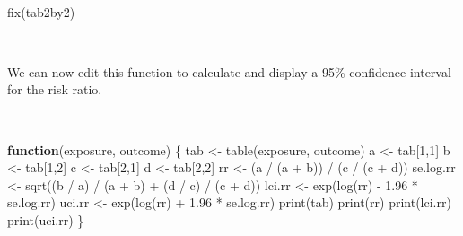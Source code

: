\documentclass[
  12pt,
]{book}
\newenvironment{Shaded}{\begin{snugshade}}{\end{snugshade}}
\newcommand{\ControlFlowTok}[1]{\textcolor[rgb]{0.13,0.29,0.53}{\textbf{#1}}}
\newcommand{\DecValTok}[1]{\textcolor[rgb]{0.00,0.00,0.81}{#1}}
\newcommand{\FloatTok}[1]{\textcolor[rgb]{0.00,0.00,0.81}{#1}}
\newcommand{\FunctionTok}[1]{\textcolor[rgb]{0.00,0.00,0.00}{#1}}
\newcommand{\NormalTok}[1]{#1}
\newcommand{\OtherTok}[1]{\textcolor[rgb]{0.56,0.35,0.01}{#1}}
\newcommand{\SpecialCharTok}[1]{\textcolor[rgb]{0.00,0.00,0.00}{#1}}
\begin{document}
~

\begin{Shaded}
\begin{Highlighting}[]
\FunctionTok{fix}\NormalTok{(tab2by2)}
\end{Highlighting}
\end{Shaded}

~

We can now edit this function to calculate and display a 95\% confidence interval for the risk ratio.

~

\begin{Shaded}
\begin{Highlighting}[]
\ControlFlowTok{function}\NormalTok{(exposure, outcome) \{}
\NormalTok{  tab }\OtherTok{\textless{}{-}} \FunctionTok{table}\NormalTok{(exposure, outcome)}
\NormalTok{  a }\OtherTok{\textless{}{-}}\NormalTok{ tab[}\DecValTok{1}\NormalTok{,}\DecValTok{1}\NormalTok{]}
\NormalTok{  b }\OtherTok{\textless{}{-}}\NormalTok{ tab[}\DecValTok{1}\NormalTok{,}\DecValTok{2}\NormalTok{]}
\NormalTok{  c }\OtherTok{\textless{}{-}}\NormalTok{ tab[}\DecValTok{2}\NormalTok{,}\DecValTok{1}\NormalTok{]}
\NormalTok{  d }\OtherTok{\textless{}{-}}\NormalTok{ tab[}\DecValTok{2}\NormalTok{,}\DecValTok{2}\NormalTok{]}
\NormalTok{  rr }\OtherTok{\textless{}{-}}\NormalTok{ (a }\SpecialCharTok{/}\NormalTok{ (a }\SpecialCharTok{+}\NormalTok{ b)) }\SpecialCharTok{/}\NormalTok{ (c }\SpecialCharTok{/}\NormalTok{ (c }\SpecialCharTok{+}\NormalTok{ d))}
\NormalTok{  se.log.rr }\OtherTok{\textless{}{-}} \FunctionTok{sqrt}\NormalTok{((b }\SpecialCharTok{/}\NormalTok{ a) }\SpecialCharTok{/}\NormalTok{ (a }\SpecialCharTok{+}\NormalTok{ b) }\SpecialCharTok{+}\NormalTok{ (d }\SpecialCharTok{/}\NormalTok{ c) }\SpecialCharTok{/}\NormalTok{ (c }\SpecialCharTok{+}\NormalTok{ d)) }
\NormalTok{  lci.rr }\OtherTok{\textless{}{-}} \FunctionTok{exp}\NormalTok{(}\FunctionTok{log}\NormalTok{(rr) }\SpecialCharTok{{-}} \FloatTok{1.96} \SpecialCharTok{*}\NormalTok{ se.log.rr)}
\NormalTok{  uci.rr }\OtherTok{\textless{}{-}} \FunctionTok{exp}\NormalTok{(}\FunctionTok{log}\NormalTok{(rr) }\SpecialCharTok{+} \FloatTok{1.96} \SpecialCharTok{*}\NormalTok{ se.log.rr)}
  \FunctionTok{print}\NormalTok{(tab)}
  \FunctionTok{print}\NormalTok{(rr)}
  \FunctionTok{print}\NormalTok{(lci.rr)}
  \FunctionTok{print}\NormalTok{(uci.rr)}
\NormalTok{\}}
\end{Highlighting}
\end{Shaded}

\newpage
\end{document}
